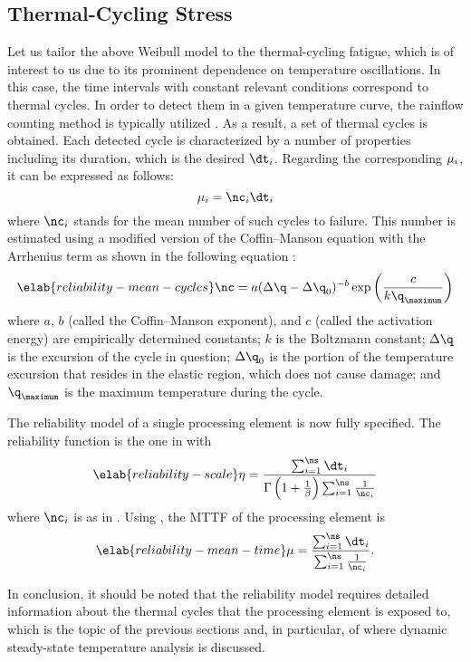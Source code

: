 \subsection{Thermal-Cycling Stress}

Let us tailor the above Weibull model to the thermal-cycling fatigue, which is
of interest to us due to its prominent dependence on temperature oscillations.
In this case, the time intervals with constant relevant conditions correspond to
thermal cycles. In order to detect them in a given temperature curve, the
rainflow counting method is typically utilized \cite{xiang2010}. As a result, a
set of \ns thermal cycles is obtained. Each detected cycle is characterized by a
number of properties including its duration, which is the desired $\dt_i$.
Regarding the corresponding $\mu_i$, it can be expressed as follows:
\[
  \mean_i = \nc_i \dt_i
\]
where $\nc_i$ stands for the mean number of such cycles to failure. This number
is estimated using a modified version of the Coffin--Manson equation with the
Arrhenius term as shown in the following equation \cite{xiang2010, jedec2016}:
\begin{equation} \elab{reliability-mean-cycles}
  \nc = a (\Delta \q - \Delta \q_0)^{-b} \exp\left(\frac{c}{k \q_\maximum}\right)
\end{equation}
where $a$, $b$ (called the Coffin--Manson exponent), and $c$ (called the
activation energy) are empirically determined constants; $k$ is the Boltzmann
constant; $\Delta \q$ is the excursion of the cycle in question; $\Delta \q_0$
is the portion of the temperature excursion that resides in the elastic region,
which does not cause damage; and $\q_\maximum$ is the maximum temperature during
the cycle.

The reliability model of a single processing element is now fully specified. The
reliability function is the one in  with
\begin{equation} \elab{reliability-scale}
  \scale = \frac{\sum_{i = 1}^\ns \dt_i}{\Gamma\left(1 + \frac{1}{\shape}\right) \sum_{i = 1}^\ns \frac{1}{\nc_i}}
\end{equation}
where $\nc_i$ is as in . Using
, the \ac{MTTF} of the processing element is
\begin{equation} \elab{reliability-mean-time}
  \mean = \frac{\sum_{i = 1}^\ns \dt_i}{\sum_{i = 1}^\ns \frac{1}{\nc_i}}.
\end{equation}

In conclusion, it should be noted that the reliability model requires detailed
information about the thermal cycles that the processing element is exposed to,
which is the topic of the previous sections and, in particular, of
 where dynamic steady-state temperature analysis is
discussed.
